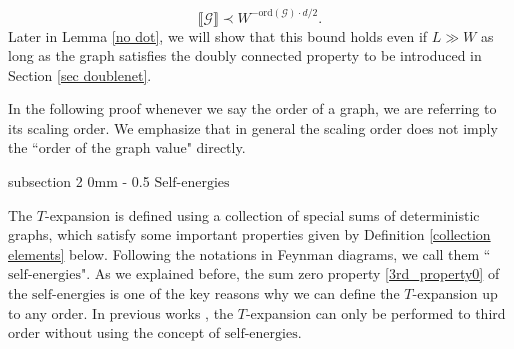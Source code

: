 \documentclass{article}
\makeatletter
\newcommand{\1}{\mathds{1}}
\numberwithin{equation}{section}
\newcommand{\e}{{\varepsilon}}
\renewcommand{\cal}{\mathcal}
\newcommand{\selfs}{\text{self-energies}}
\newcommand{\Selfs}{\text{Self-energies}}
\DeclareMathOperator{\OO}{O}
\theoremstyle{plain} %
\theoremstyle{remark}
\newcommand{\cor}{\color{red}}
\newcommand{\Cele}{{\mathscr E}}
\renewcommand{\subsection}{\@startsection
{subsection}%
{2}%
{0mm}%
{-\baselineskip}%
{0.5\baselineskip}%
{\normalfont\bf\itshape}} %
\newcommand{\hty}[1]{{\cor (ht: #1) }}
\makeatother
\begin{document}
$$\llbracket \cal G\rrbracket\prec W^{-\text{ord}(\cal G)\cdot d/2}.$$ 
Later in Lemma \ref{no dot}, %
we will show that this bound holds even if $L\gg W$ as long as the graph satisfies the doubly connected property to be introduced in Section \ref{sec doublenet}. %

  
In the following proof whenever we say the order of a graph, we are referring to its scaling order. We emphasize that in general the scaling order does not imply the ``order of the graph value" directly. 





\subsection{$\Selfs$}\label{sec self}

The $T$-expansion is defined using a collection of special sums of deterministic graphs, which satisfy some important properties given by Definition \ref{collection elements} below. Following the notations in Feynman diagrams, we call them ``$\selfs$". %
As we explained before, %
the sum zero property \eqref{3rd_property0} of the $\selfs$ is one of the key reasons why we can define the $T$-expansion up to any order. In previous works \cite{delocal,PartIII}, the $T$-expansion can only be performed to third order without using the concept of $\selfs$.  
 
\end{document}
